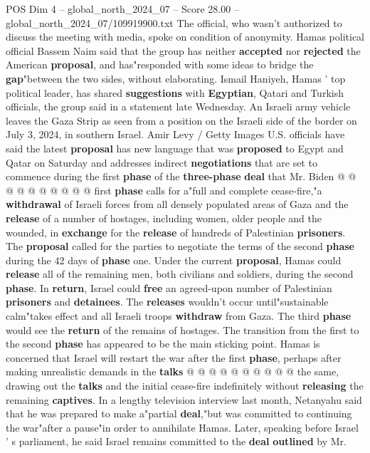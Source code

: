 \begin{textsample}{POS Dim 4 – global\_north\_2024\_07 – Score 28.00 – global\_north\_2024\_07/109919900.txt}
The official, who wasn't authorized to discuss the meeting with media, spoke on condition of anonymity.
Hamas political official Bassem Naim said that the group has neither \textbf{accepted} nor \textbf{rejected} the American \textbf{proposal}, and has"responded with some ideas to bridge the \textbf{gap}"between the two sides, without elaborating.
Ismail Haniyeh, Hamas ' top political leader, has shared \textbf{suggestions} with \textbf{Egyptian}, Qatari and Turkish officials, the group said in a statement late Wednesday.
An Israeli army vehicle leaves the Gaza Strip as seen from a position on the Israeli side of the border on July 3, 2024, in southern Israel.
Amir Levy / Getty Images U.S. officials have said the latest \textbf{proposal} has new language that was \textbf{proposed} to Egypt and Qatar on Saturday and addresses indirect \textbf{negotiations} that are set to commence during the first \textbf{phase} of the \textbf{three-phase} \textbf{deal} that Mr.
Biden @ @ @ @ @ @ @ @ @ @ first \textbf{phase} calls for a"full and complete cease-fire,"a \textbf{withdrawal} of Israeli forces from all densely populated areas of Gaza and the \textbf{release} of a number of hostages, including women, older people and the wounded, in \textbf{exchange} for the \textbf{release} of hundreds of Palestinian \textbf{prisoners}.
The \textbf{proposal} called for the parties to negotiate the terms of the second \textbf{phase} during the 42 days of \textbf{phase} one.
Under the current \textbf{proposal}, Hamas could \textbf{release} all of the remaining men, both civilians and soldiers, during the second \textbf{phase}.
In \textbf{return}, Israel could \textbf{free} an agreed-upon number of Palestinian \textbf{prisoners} and \textbf{detainees}.
The \textbf{releases} wouldn't occur until"sustainable calm"takes effect and all Israeli troops \textbf{withdraw} from Gaza.
The third \textbf{phase} would see the \textbf{return} of the remains of hostages.
The transition from the first to the second \textbf{phase} has appeared to be the main sticking point.
Hamas is concerned that Israel will restart the war after the first \textbf{phase}, perhaps after making unrealistic demands in the \textbf{talks} @ @ @ @ @ @ @ @ @ @ the same, drawing out the \textbf{talks} and the initial cease-fire indefinitely without \textbf{releasing} the remaining \textbf{captives}.
In a lengthy television interview last month, Netanyahu said that he was prepared to make a"partial \textbf{deal},"but was committed to continuing the war"after a pause"in order to annihilate Hamas.
Later, speaking before Israel ' s parliament, he said Israel remains committed to the \textbf{deal} \textbf{outlined} by Mr.

\end{textsample}
